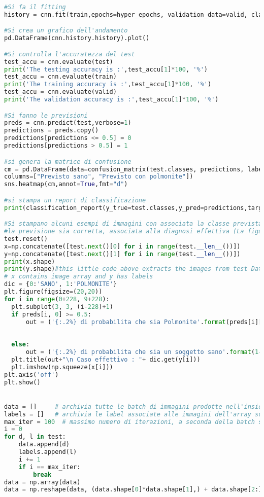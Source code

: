 \begin{lstlisting}[basicstyle=\tiny, language=Python, caption=Esempio di implementazione di una CNN per la classificazione di raggi-X.~\cite{dspneum} ]
#Si fa il fitting
history = cnn.fit(train,epochs=hyper_epochs, validation_data=valid, class_weight=cw, callbacks=callbacks_list)

#Si crea un grafico dell'andamento 
pd.DataFrame(cnn.history.history).plot()

#Si controlla l'accuratezza del test
test_accu = cnn.evaluate(test)
print('The testing accuracy is :',test_accu[1]*100, '%')
test_accu = cnn.evaluate(train)
print('The training accuracy is :',test_accu[1]*100, '%')
test_accu = cnn.evaluate(valid)
print('The validation accuracy is :',test_accu[1]*100, '%')

#Si fanno le previsioni
preds = cnn.predict(test,verbose=1)
predictions = preds.copy()
predictions[predictions <= 0.5] = 0
predictions[predictions > 0.5] = 1

#si genera la matrice di confusione
cm = pd.DataFrame(data=confusion_matrix(test.classes, predictions, labels=[0, 1]),index=["Sano effettivo", "Polmonite effettiva"],
columns=["Previsto sano", "Previsto con polmonite"])
sns.heatmap(cm,annot=True,fmt="d")

#si stampa un report di classificazione
print(classification_report(y_true=test.classes,y_pred=predictions,target_names =['NORMALE','POLMONITE']))

#Si stampano alcuni esempi di immagini con associata la classe prevista e la probabilita con cui 
#la previsione sia corretta, associata alla diagnosi effettiva (La figura 5.6 mostra l'output ottenuto)
test.reset()
x=np.concatenate([test.next()[0] for i in range(test.__len__())])
y=np.concatenate([test.next()[1] for i in range(test.__len__())])
print(x.shape)
print(y.shape)#this little code above extracts the images from test Data iterator without shuffling the sequence
# x contains image array and y has labels 
dic = {0:'SANO', 1:'POLMONITE'}
plt.figure(figsize=(20,20))
for i in range(0+228, 9+228):
  plt.subplot(3, 3, (i-228)+1)
  if preds[i, 0] >= 0.5: 
      out = ('{:.2%} di probabilita che sia Polmonite'.format(preds[i][0]))
      
      
  else: 
      out = ('{:.2%} di probabilita che sia un soggetto sano'.format(1-preds[i][0]))
  plt.title(out+"\n Caso effettivo : "+ dic.get(y[i]))    
  plt.imshow(np.squeeze(x[i]))
plt.axis('off')
plt.show()


data = []     # archivia tutte le batch di immagini prodotte nell'insieme di test
labels = []   # archivia le label associate alle immagini dell'array sopra
max_iter = 100  # massimo numero di iterazioni, a seconda della batch size e della dimensione del dataset
i = 0
for d, l in test:
    data.append(d)
    labels.append(l)
    i += 1
    if i == max_iter:
        break
data = np.array(data)
data = np.reshape(data, (data.shape[0]*data.shape[1],) + data.shape[2:])


\end{lstlisting}
